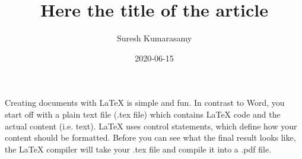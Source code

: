 \documentclass{article}
\title{Here the title of the article}
\author{Suresh Kumarasamy}
\date{2020-06-15}
\begin{document}
\maketitle
Creating documents with LaTeX is simple and fun. In contrast to Word, you start off with a plain text file (.tex file) which contains LaTeX code and the actual content (i.e. text). LaTeX uses control statements, which define how your content should be formatted. Before you can see what the final result looks like, the LaTeX compiler will take your .tex file and compile it into a .pdf file.
\end{document}
